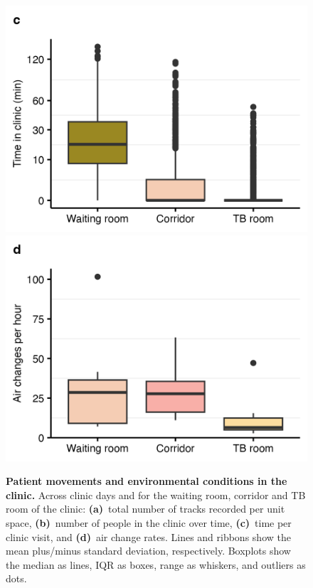 \documentclass[fleqn,11pt]{wlscirep}
\begin{document}
\begin{figure}
    \includegraphics{results/data/time-in-clinic.png}
    \includegraphics{results/data/air-changes-per-hour.png}
    \caption{\textbf{Patient movements and environmental conditions in the clinic.} Across clinic days and for the waiting room, corridor and TB room of the clinic: \textbf{(a)}~total number of tracks recorded per unit space, \textbf{(b)}~number of people in the clinic over time, \textbf{(c)}~time per clinic visit, and \textbf{(d)}~air change rates. Lines and ribbons show the mean plus/minus standard deviation, respectively. Boxplots show the median as lines, IQR as boxes, range as whiskers, and outliers as dots.}
    \label{fig:input-data-descriptives}
\end{figure}
\end{document}
